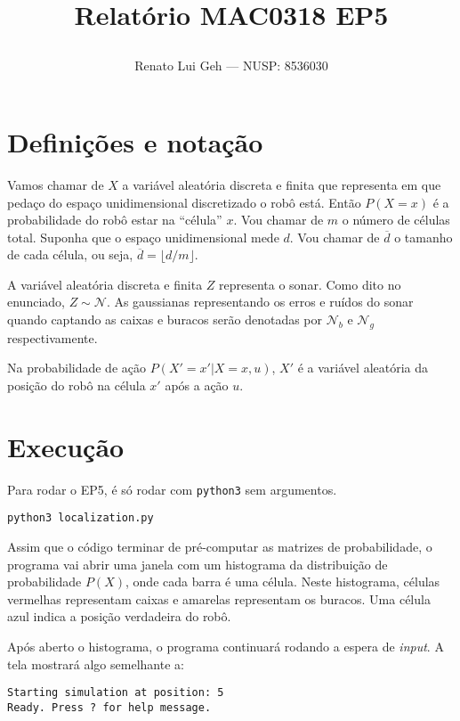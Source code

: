 \documentclass[12pt]{article}
\title{%
  \textbf{Relatório MAC0318 EP5}\\
  \author{Renato Lui Geh --- NUSP\@: 8536030}
}
\date{}
\newcommand{\ov}{\overline}
\theoremstyle{plain}
\numberwithin{equation}{section}
\newcommand{\code}[1]{\lstinline[mathescape=true]{#1}}
\begin{document}
\maketitle

\section{Definições e notação}

Vamos chamar de $X$ a variável aleatória discreta e finita que representa em que pedaço do espaço
unidimensional discretizado o robô está. Então $P(X=x)$ é a probabilidade do robô estar na
``célula'' $x$. Vou chamar de $m$ o número de células total. Suponha que o espaço unidimensional
mede $d$. Vou chamar de $\ov{d}$ o tamanho de cada célula, ou seja, $\ov{d}=\lfloor d/m\rfloor$.

A variável aleatória discreta e finita $Z$ representa o sonar. Como dito no enunciado,
$Z\sim\mathcal{N}$. As gaussianas representando os erros e ruídos do sonar quando captando as
caixas e buracos serão denotadas por $\mathcal{N}_b$ e $\mathcal{N}_g$ respectivamente.

Na probabilidade de ação $P(X'=x'|X=x,u)$, $X'$ é a variável aleatória da posição do robô na célula
$x'$ após a ação $u$.

\section{Execução}

Para rodar o EP5, é só rodar com \code{python3} sem argumentos.\\

\begin{lstlisting}
python3 localization.py
\end{lstlisting}

Assim que o código terminar de pré-computar as matrizes de probabilidade, o programa vai abrir uma
janela com um histograma da distribuição de probabilidade $P(X)$, onde cada barra é uma célula.
Neste histograma, células vermelhas representam caixas e amarelas representam os buracos. Uma
célula azul indica a posição verdadeira do robô.

Após aberto o histograma, o programa continuará rodando a espera de \textit{input}. A tela mostrará
algo semelhante a:\\

\begin{lstlisting}
Starting simulation at position: 5
Ready. Press ? for help message.
\end{lstlisting}
\end{document}
